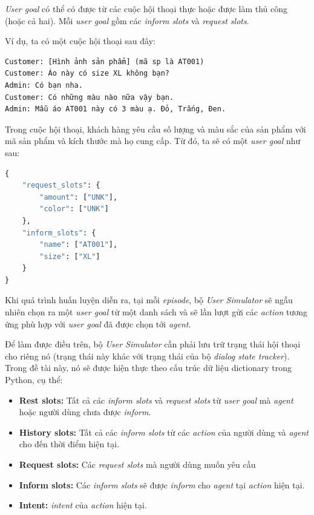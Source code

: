 \textit{User goal} có thể có được từ các cuộc hội thoại thực hoặc
được làm thủ công (hoặc cả hai). Mỗi \textit{user goal} gồm các
\textit{inform slots} và \textit{request slots}.

Ví dụ, ta có một cuộc hội thoại sau đây:

\begin{verbatim}
Customer: [Hình ảnh sản phẩm] (mã sp là AT001)
Customer: Áo này có size XL không bạn?
Admin: Có bạn nha.
Customer: Có những màu nào nữa vậy bạn.
Admin: Mẫu áo AT001 này có 3 màu ạ. Đỏ, Trắng, Đen.
\end{verbatim}

Trong cuộc hội thoại, khách hàng yêu cầu số lượng và màu sắc của sản phẩm với mã sản phẩm và kích thước mà họ cung cấp. Từ đó, ta sẽ có một \textit{user goal} như sau:

\begin{lstlisting}[language=Python]
{
    "request_slots": {
        "amount": ["UNK"],
        "color": ["UNK"]
    },
    "inform_slots": {
        "name": ["AT001"],
        "size": ["XL"]
    }
}
\end{lstlisting}

Khi quá trình huấn luyện diễn ra, tại mỗi \textit{episode}, bộ
\textit{User Simulator} sẽ ngẫu nhiên chọn ra một \textit{user goal}
từ một danh sách và sẽ lần lượt gửi các \textit{action} tương ứng
phù hợp với \textit{user goal} đã được chọn tới \textit{agent}.

Để làm được điều trên, bộ \textit{User Simulator} cần phải lưu trữ
trạng thái hội thoại cho riêng nó (trạng thái này khác với trạng thái
của bộ \textit{dialog state tracker}). Trong đề tài này, nó sẽ được
hiện thực theo cấu trúc dữ liệu dictionary trong Python, cụ thể:

\begin{itemize}
    \item \textbf{Rest slots:} Tất cả các \textit{inform slots} và
    \textit{request slots} từ \textit{user goal} mà \textit{agent}
    hoặc người dùng chưa được \textit{inform}.
    \item \textbf{History slots:} Tất cả các \textit{inform slots}
    từ các \textit{action} của người dùng và \textit{agent}
    cho đến thời điểm hiện tại.
    \item \textbf{Request slots:} Các \textit{request slots} mà
    người dùng muốn yêu cầu
    \item \textbf{Inform slots:} Các \textit{inform slots} sẽ được
    \textit{inform} cho \textit{agent} tại \textit{action} hiện tại.
    \item \textbf{Intent:} \textit{intent} của \textit{action} hiện tại.
\end{itemize}

